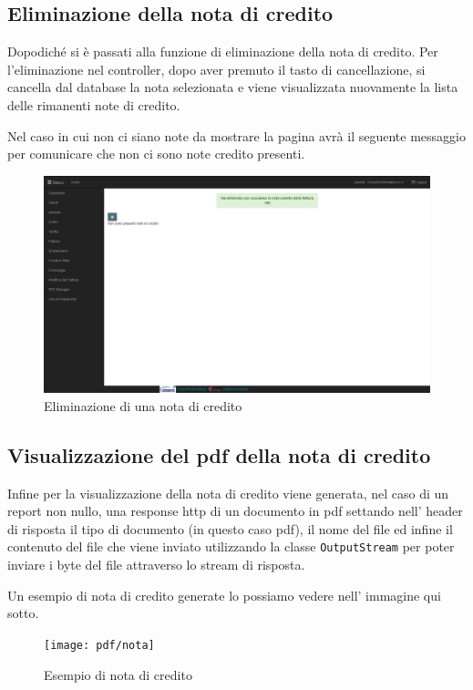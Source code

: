 \documentclass[12pt]{book}
\begin{document}
\subsection{Eliminazione della nota di credito}
Dopodiché si è passati alla funzione di eliminazione della nota di credito.
Per l'eliminazione nel controller, dopo aver premuto il tasto di cancellazione, 
si cancella dal database la nota selezionata e viene
visualizzata nuovamente la lista delle rimanenti note di credito.

Nel caso in cui non ci siano note da mostrare la pagina avrà il seguente 
messaggio per comunicare che non ci sono note credito presenti.
\begin{figure}[H]
    \centering
    \includegraphics[scale=0.4]{img/eliminazione_nota_credito}
    \caption{Eliminazione di una nota di credito}\label{fig:eliminazione}
\end{figure}
\subsection{Visualizzazione del pdf della nota di credito}
Infine per la visualizzazione della nota di credito viene generata, nel 
caso di un report non nullo, una response http di un documento in pdf
settando nell' header di risposta il tipo di documento (in questo caso pdf),
il nome del file ed infine il contenuto del file che viene inviato utilizzando
la classe \texttt{OutputStream} per poter inviare i byte del file attraverso 
lo stream di risposta.

Un esempio di nota di credito generate lo possiamo vedere nell' immagine 
qui sotto.
\begin{figure}[H]
    \centering
    \texttt{[image: pdf/nota]}
    \caption{Esempio di nota di credito}\label{fig:nota}
\end{figure}
\clearpage
\end{document}
